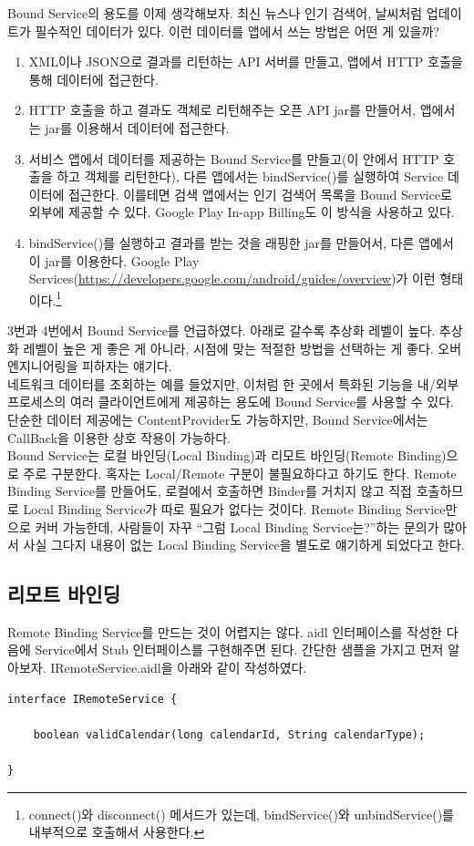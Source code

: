 Bound Service의 용도를 이제 생각해보자.
최신 뉴스나 인기 검색어, 날씨처럼 업데이트가 필수적인 데이터가 있다. 이런 데이터를 앱에서 쓰는 방법은 어떤 게 있을까?
\begin{enumerate}
\item XML이나 JSON으로 결과를 리턴하는 API 서버를 만들고, 앱에서 HTTP 호출을 통해 데이터에 접근한다.

\item HTTP 호출을 하고 결과도 객체로 리턴해주는 오픈 API jar를 만들어서, 앱에서는 jar를 이용해서 데이터에 접근한다.

\item 서비스 앱에서 데이터를 제공하는 Bound Service를 만들고(이 안에서 HTTP 호출을 하고 객체를 리턴한다), 다른 앱에서는 bindService()를 실행하여 Service 데이터에 접근한다. 
이를테면 검색 앱에서는 인기 검색어 목록을 Bound Service로 외부에 제공할 수 있다.
Google Play In-app Billing도 이 방식을 사용하고 있다.

\item bindService()를 실행하고 결과를 받는 것을 래핑한 jar를 만들어서, 다른 앱에서 이 jar를 이용한다. 
Google Play Services(\url{https://developers.google.com/android/guides/overview})가 이런 형태이다.\footnote{connect()와 disconnect() 메서드가 있는데, bindService()와 unbindService()를 내부적으로 호출해서 사용한다.}
\end{enumerate}
3번과 4번에서 Bound Service를 언급하였다. 
아래로 갈수록 추상화 레벨이 높다. 추상화 레벨이 높은 게 좋은 게 아니라, 시점에 맞는 적절한 방법을 선택하는 게 좋다. 오버엔지니어링을 피하자는 얘기다.\\

네트워크 데이터를 조회하는 예를 들었지만, 이처럼 한 곳에서 특화된 기능을 내/외부 프로세스의 여러 클라이언트에게 제공하는 용도에 Bound Service를 사용할 수 있다. 
단순한 데이터 제공에는 ContentProvider도 가능하지만, Bound Service에서는 CallBack을 이용한 상호 작용이 가능하다.\\

Bound Service는 로컬 바인딩(Local Binding)과 리모트 바인딩(Remote Binding)으로 주로 구분한다.
혹자는 Local/Remote 구분이 불필요하다고 하기도 한다.
Remote Binding Service를 만들어도, 로컬에서 호출하면 Binder를 거치지 않고 직접 호출하므로 Local Binding Service가 따로 필요가 없다는 것이다. 
Remote Binding Service만으로 커버 가능한데, 사람들이 자꾸 ``그럼 Local Binding Service는?''하는 문의가 많아서 사실 그다지 내용이 없는 Local Binding Service을 별도로 얘기하게 되었다고 한다.

\subsection{리모트 바인딩}
Remote Binding Service를 만드는 것이 어렵지는 않다. 
aidl 인터페이스를 작성한 다음에 Service에서 Stub 인터페이스를 구현해주면 된다.
간단한 샘플을 가지고 먼저 알아보자. 
IRemoteService.aidl을 아래와 같이 작성하였다. 
\begin{lstlisting}[frame=single]
interface IRemoteService {

	boolean validCalendar(long calendarId, String calendarType);
		
}
\end{lstlisting}

